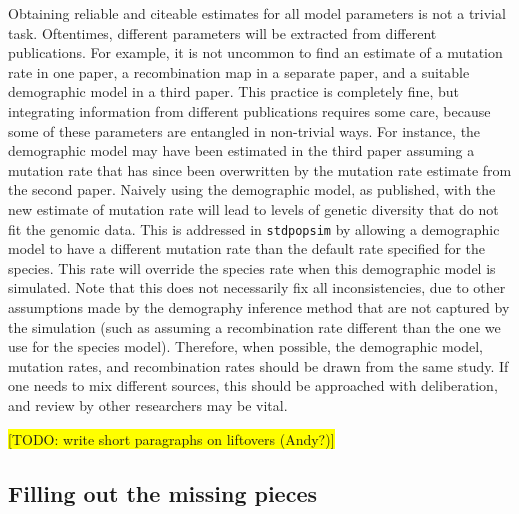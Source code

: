 \documentclass[hidelinks]{article}
\newcommand{\stdpopsim}{\texttt{stdpopsim}\xspace}
\begin{document}
Obtaining reliable and citeable estimates for all model parameters is not a trivial task. Oftentimes, different parameters will be extracted from different publications. For example, it is not uncommon to find an estimate of a mutation rate in one paper, a recombination map in a separate paper, and a suitable demographic model in a third paper. This practice is completely fine, but integrating information from different publications requires some care, because some of these parameters are entangled in non-trivial ways.
For instance, the demographic model may have been estimated in the third paper assuming a mutation rate that has since been overwritten by the mutation rate estimate from the second paper. Naively using the demographic model, as published, with the new estimate of mutation rate will lead to levels of genetic diversity that do not fit the genomic data.
%
This is addressed in \texttt{\stdpopsim} by allowing a demographic model to have a different mutation rate than the default rate specified for the species. This rate will override the species rate when this demographic model is simulated.
%
Note that this does not necessarily fix all inconsistencies, due to other assumptions made by the demography inference method that are not captured by the simulation (such as assuming a recombination rate different than the one we use for the species model). Therefore, when possible, the demographic model, mutation rates, and recombination rates should
be drawn from the same study. If one needs to mix different sources, this should be approached with deliberation, and review by other researchers may be vital.


\colorbox{yellow}{[TODO: write short paragraphs on liftovers (Andy?)]}

\subsection*{Filling out the missing pieces}
\end{document}

